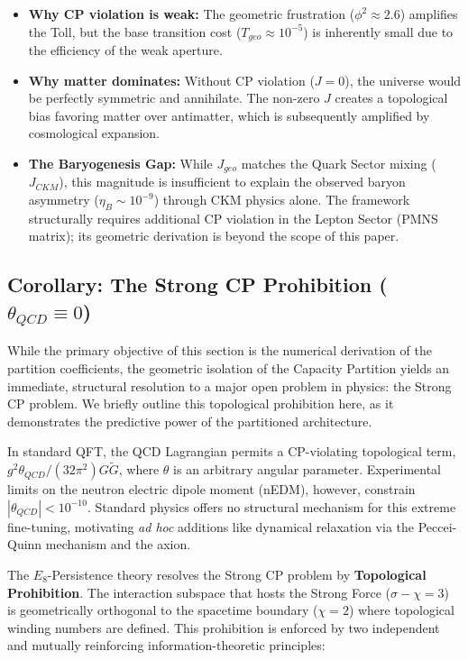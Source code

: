 \begin{itemize}
    \item \textbf{Why CP violation is weak:} The geometric frustration ($\phi^2 \approx 2.6$) amplifies the Toll, but the base transition cost ($T_{geo} \approx 10^{-5}$) is inherently small due to the efficiency of the weak aperture.
    
    \item \textbf{Why matter dominates:} Without CP violation ($J=0$), the universe would be perfectly symmetric and annihilate. The non-zero $J$ creates a topological bias favoring matter over antimatter, which is subsequently amplified by cosmological expansion.
    
    \item \textbf{The Baryogenesis Gap:} While $J_{geo}$ matches the Quark Sector mixing ($J_{CKM}$), this magnitude is insufficient to explain the observed baryon asymmetry ($\eta_B \sim 10^{-9}$) through CKM physics alone. The framework structurally requires additional CP violation in the Lepton Sector (PMNS matrix); its geometric derivation is beyond the scope of this paper.
\end{itemize}


\subsection{Corollary: The Strong CP Prohibition (\texorpdfstring{$\theta_{QCD} \equiv 0$}{theta\_QCD = 0})}
\label{sec:strong_cp_prohibition}

While the primary objective of this section is the numerical derivation of the partition coefficients, the geometric isolation of the Capacity Partition yields an immediate, structural resolution to a major open problem in physics: the Strong CP problem. We briefly outline this topological prohibition here, as it demonstrates the predictive power of the partitioned architecture.

In standard QFT, the QCD Lagrangian permits a CP-violating topological term, $g^2\theta_{QCD}/(32\pi^2) G\tilde{G}$, where $\theta$ is an arbitrary angular parameter. Experimental limits on the neutron electric dipole moment (nEDM), however, constrain $|\theta_{QCD}| < 10^{-10}$. Standard physics offers no structural mechanism for this extreme fine-tuning, motivating \textit{ad hoc} additions like dynamical relaxation via the Peccei-Quinn mechanism and the axion.

The $E_8$-Persistence theory resolves the Strong CP problem by \textbf{Topological Prohibition}. The interaction subspace that hosts the Strong Force ($\sigma-\chi=3$) is geometrically orthogonal to the spacetime boundary ($\chi=2$) where topological winding numbers are defined. This prohibition is enforced by two independent and mutually reinforcing information-theoretic principles:


